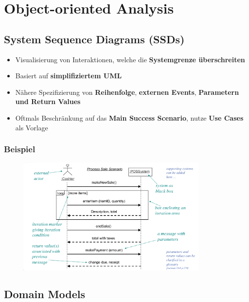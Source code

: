 \section{Object-oriented Analysis}
\label{an:sec:analysis}

\subsection{System Sequence Diagrams (SSDs)}
\label{an:sub:system_sequence_diagrams}

\begin{itemize}
	\item Visualisierung von Interaktionen, welche die \textbf{Systemgrenze überschreiten}
	\item Basiert auf \textbf{simplifiziertem UML}
	\item Nähere Spezifizierung von \textbf{Reihenfolge}, \textbf{externen Events}, \textbf{Parametern und Return Values}
	\item Oftmals Beschränkung auf das \textbf{Main Success Scenario}, nutze \textbf{Use Cases} als Vorlage
\end{itemize}

\subsubsection{Beispiel}
\label{an:ssub:beispiel0}

\begin{figure}[!h]
	\centering
	\includegraphics[width=0.85\textwidth]{images/ssd.png}
\end{figure}

\subsection{Domain Models}
\label{an:sub:domain_models}

